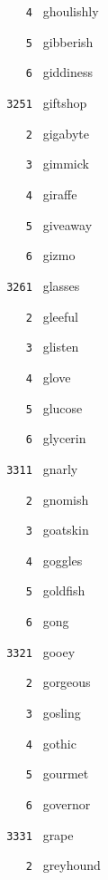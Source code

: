 \documentclass[11pt]{article}
\begin{document}
\begin{multicols}{6}
\noindent \texttt{ \ \ \ 4 } ghoulishly  \par
\noindent \texttt{ \ \ \ 5 } gibberish  \par
\noindent \texttt{ \ \ \ 6 } giddiness  \par
\vspace{3mm}
\noindent \texttt{ 3251 } giftshop  \par
\noindent \texttt{ \ \ \ 2 } gigabyte  \par
\noindent \texttt{ \ \ \ 3 } gimmick  \par
\noindent \texttt{ \ \ \ 4 } giraffe  \par
\noindent \texttt{ \ \ \ 5 } giveaway  \par
\noindent \texttt{ \ \ \ 6 } gizmo  \par
\vspace{3mm}
\noindent \texttt{ 3261 } glasses  \par
\noindent \texttt{ \ \ \ 2 } gleeful  \par
\noindent \texttt{ \ \ \ 3 } glisten  \par
\noindent \texttt{ \ \ \ 4 } glove  \par
\noindent \texttt{ \ \ \ 5 } glucose  \par
\noindent \texttt{ \ \ \ 6 } glycerin  \par
\noindent \texttt{ 3311 } gnarly  \par
\noindent \texttt{ \ \ \ 2 } gnomish  \par
\noindent \texttt{ \ \ \ 3 } goatskin  \par
\noindent \texttt{ \ \ \ 4 } goggles  \par
\noindent \texttt{ \ \ \ 5 } goldfish  \par
\noindent \texttt{ \ \ \ 6 } gong  \par
\vspace{3mm}
\noindent \texttt{ 3321 } gooey  \par
\noindent \texttt{ \ \ \ 2 } gorgeous  \par
\noindent \texttt{ \ \ \ 3 } gosling  \par
\noindent \texttt{ \ \ \ 4 } gothic  \par
\noindent \texttt{ \ \ \ 5 } gourmet  \par
\noindent \texttt{ \ \ \ 6 } governor  \par
\vspace{3mm}
\noindent \texttt{ 3331 } grape  \par
\noindent \texttt{ \ \ \ 2 } greyhound  \par

\end{multicols}
\end{document}
